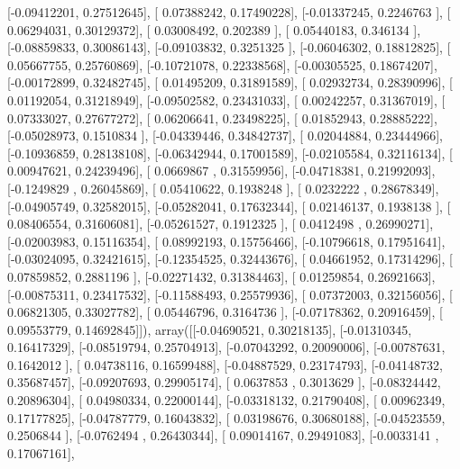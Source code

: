 \documentclass{article}
\begin{document}
       [-0.09412201,  0.27512645],
       [ 0.07388242,  0.17490228],
       [-0.01337245,  0.2246763 ],
       [ 0.06294031,  0.30129372],
       [ 0.03008492,  0.202389  ],
       [ 0.05440183,  0.346134  ],
       [-0.08859833,  0.30086143],
       [-0.09103832,  0.3251325 ],
       [-0.06046302,  0.18812825],
       [ 0.05667755,  0.25760869],
       [-0.10721078,  0.22338568],
       [-0.00305525,  0.18674207],
       [-0.00172899,  0.32482745],
       [ 0.01495209,  0.31891589],
       [ 0.02932734,  0.28390996],
       [ 0.01192054,  0.31218949],
       [-0.09502582,  0.23431033],
       [ 0.00242257,  0.31367019],
       [ 0.07333027,  0.27677272],
       [ 0.06206641,  0.23498225],
       [ 0.01852943,  0.28885222],
       [-0.05028973,  0.1510834 ],
       [-0.04339446,  0.34842737],
       [ 0.02044884,  0.23444966],
       [-0.10936859,  0.28138108],
       [-0.06342944,  0.17001589],
       [-0.02105584,  0.32116134],
       [ 0.00947621,  0.24239496],
       [ 0.0669867 ,  0.31559956],
       [-0.04718381,  0.21992093],
       [-0.1249829 ,  0.26045869],
       [ 0.05410622,  0.1938248 ],
       [ 0.0232222 ,  0.28678349],
       [-0.04905749,  0.32582015],
       [-0.05282041,  0.17632344],
       [ 0.02146137,  0.1938138 ],
       [ 0.08406554,  0.31606081],
       [-0.05261527,  0.1912325 ],
       [ 0.0412498 ,  0.26990271],
       [-0.02003983,  0.15116354],
       [ 0.08992193,  0.15756466],
       [-0.10796618,  0.17951641],
       [-0.03024095,  0.32421615],
       [-0.12354525,  0.32443676],
       [ 0.04661952,  0.17314296],
       [ 0.07859852,  0.2881196 ],
       [-0.02271432,  0.31384463],
       [ 0.01259854,  0.26921663],
       [-0.00875311,  0.23417532],
       [-0.11588493,  0.25579936],
       [ 0.07372003,  0.32156056],
       [ 0.06821305,  0.33027782],
       [ 0.05446796,  0.3164736 ],
       [-0.07178362,  0.20916459],
       [ 0.09553779,  0.14692845]]), array([[-0.04690521,  0.30218135],
       [-0.01310345,  0.16417329],
       [-0.08519794,  0.25704913],
       [-0.07043292,  0.20090006],
       [-0.00787631,  0.1642012 ],
       [ 0.04738116,  0.16599488],
       [-0.04887529,  0.23174793],
       [-0.04148732,  0.35687457],
       [-0.09207693,  0.29905174],
       [ 0.0637853 ,  0.3013629 ],
       [-0.08324442,  0.20896304],
       [ 0.04980334,  0.22000144],
       [-0.03318132,  0.21790408],
       [ 0.00962349,  0.17177825],
       [-0.04787779,  0.16043832],
       [ 0.03198676,  0.30680188],
       [-0.04523559,  0.2506844 ],
       [-0.0762494 ,  0.26430344],
       [ 0.09014167,  0.29491083],
       [-0.0033141 ,  0.17067161],
\end{document}
